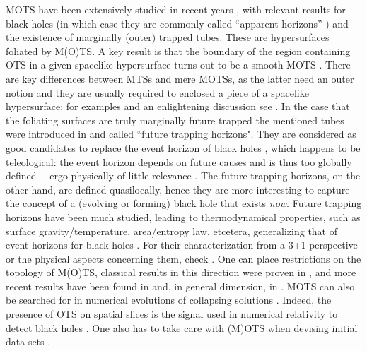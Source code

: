 \documentclass[12pt]{iopart}
\begin{document}
MOTS have been extensively studied in recent years \cite{AMS,AMS1,AM,CM}, with relevant results for black holes (in which case they are commonly called ``apparent horizons'' \cite{HE,Wald}) and the existence of marginally (outer) trapped tubes. These are hypersurfaces foliated by M(O)TS. A key result is that the boundary of the region containing OTS in a given spacelike hypersurface turns out to be a smooth MOTS \cite{KrH,AM}. There are key differences between MTSs and mere MOTSs, as the latter need an outer notion and they are usually required to enclosed a piece of a spacelike hypersurface; for examples and an enlightening discussion see \cite{Bengtsson}. In the case that the foliating surfaces are truly marginally future trapped the mentioned tubes were introduced in \cite{Hay} and called ``future trapping horizons". They are considered as good candidates to replace the event horizon of black holes \cite{H4,HE,Wald}, which happens to be teleological: the event horizon depends on future causes and is thus too globally defined ---ergo physically of little relevance \cite{AK}. The future trapping horizons, on the other hand, are defined quasilocally, hence they are more interesting to capture the concept of a (evolving or forming)  black hole that exists {\it now}. Future trapping horizons have been much studied, leading to thermodynamical properties, such as surface gravity/temperature, area/entropy law, etcetera, generalizing that of event horizons for black holes \cite{AK,Hay,Hay2,GJ,BoFa}. For their characterization from a 3+1 perspective or the physical aspects concerning them, check \cite{Jara,Nie,Booth1}. One can place restrictions on the topology of M(O)TS, classical results in this direction were proven in \cite{H4,Ne3}, and more recent results have been found in \cite{AMS,AMS1} and, in general dimension, in \cite{GaSc,Gal2}.  MOTS can also be searched for in numerical evolutions of collapsing solutions \cite{JVG,Thor}. Indeed, the presence of OTS on spatial slices is the signal used in numerical relativity to detect black holes \cite{BSh}. One also has to take care with (M)OTS when devising initial data sets \cite{Win}. 
\end{document}
